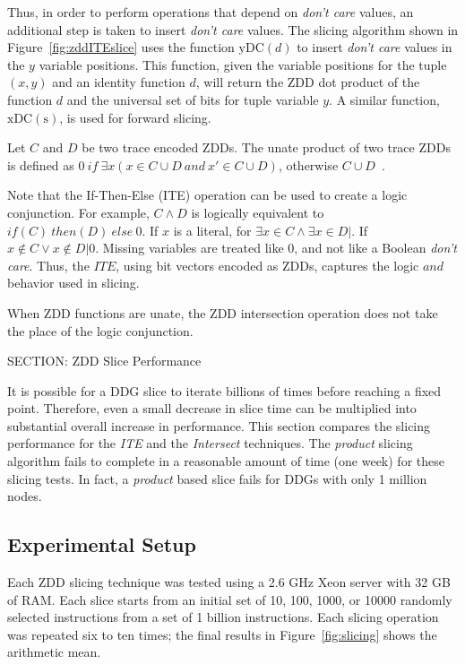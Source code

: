 {Thus, in order to perform operations that depend on \textit{don't care} values, an additional step is taken to insert \textit{don't care} values.  The slicing algorithm shown in Figure~\ref{fig:zddITEslice} uses the function $\mathrm{yDC}(d)$ to insert \textit{don't care} values in the $y$ variable positions.  This function, given the variable positions for the tuple $(x,y)$ and an identity function $d$, will return the ZDD dot product\cite{mishchenko:01:sc} of the function $d$ and the universal set of bits for tuple variable $y$.  A similar function, $\mathrm{xDC(s)}$, is used for forward slicing.

Let $C$ and $D$ be two trace encoded ZDDs.  The unate product of two trace ZDDs is defined as $0 \ if \ \exists x(x \in C \cup D \ and \ x' \in C \cup D)$, otherwise $C \cup D$~\cite{hachtel:00:kap}.

Note that the If-Then-Else (ITE) operation can be used to create a logic conjunction.  For example, $C \wedge D$ is logically equivalent to $if(C) \ then(D) \ else \ 0$.  If $x$ is a literal, for $\exists x \in C \wedge \exists x \in D | $.  If $x \not \in C \vee x \not \in D|0$.  Missing variables are treated like $0$, and not like a Boolean \textit{don't care}.  Thus, the $ITE$, using bit vectors encoded as ZDDs, captures the logic $and$ behavior used in slicing.

When ZDD functions are unate, the ZDD intersection operation does not take the place of the logic conjunction.

SECTION: ZDD Slice Performance


It is possible for a DDG slice to iterate billions of times before reaching a fixed point.  Therefore, even a small decrease in slice time can be multiplied into substantial overall increase in performance.  This section compares the slicing performance for the \textit{ITE} and the \textit{Intersect} techniques.  The \textit{product} slicing algorithm fails to complete in a reasonable amount of time (one week) for these slicing tests.  In fact, a \textit{product} based slice fails for DDGs with only 1 million nodes.

\subsection {Experimental Setup}

Each ZDD slicing technique was tested using a 2.6 GHz Xeon server with 32 GB of RAM.  Each slice starts from an initial set of 10, 100, 1000, or 10000 randomly selected instructions from a set of 1 billion instructions. Each slicing operation was repeated six to ten times; the final results in Figure~\ref{fig:slicing} shows the arithmetic mean.

}
